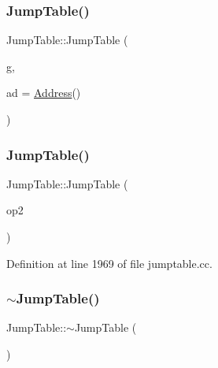 \subsubsection{\texorpdfstring{JumpTable()}{JumpTable()}\hspace{0.1cm}{\footnotesize\ttfamily [1/2]}}
{\footnotesize\ttfamily Jump\+Table\+::\+Jump\+Table (\begin{DoxyParamCaption}\item[{\mbox{\hyperlink{class_architecture}{Architecture}} $\ast$}]{g,  }\item[{\mbox{\hyperlink{class_address}{Address}}}]{ad = {\ttfamily \mbox{\hyperlink{class_address}{Address}}()} }\end{DoxyParamCaption})}

\mbox{\label{class_jump_table_a5dc7b9ca334dba4d61a615f7a016b820}} 
\subsubsection{\texorpdfstring{JumpTable()}{JumpTable()}\hspace{0.1cm}{\footnotesize\ttfamily [2/2]}}
{\footnotesize\ttfamily Jump\+Table\+::\+Jump\+Table (\begin{DoxyParamCaption}\item[{const \mbox{\hyperlink{class_jump_table}{Jump\+Table}} $\ast$}]{op2 }\end{DoxyParamCaption})}



Definition at line 1969 of file jumptable.\+cc.

\mbox{\label{class_jump_table_a03847c123233a3f60e923fa6ae27af88}} 
\subsubsection{\texorpdfstring{$\sim$JumpTable()}{~JumpTable()}}
{\footnotesize\ttfamily Jump\+Table\+::$\sim$\+Jump\+Table (\begin{DoxyParamCaption}\item[{void}]{ }\end{DoxyParamCaption})}



